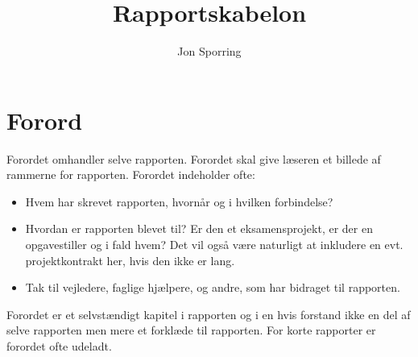 \documentclass[a4paper]{article}
\title{Rapportskabelon}
\author{Jon Sporring }
\begin{document}
\maketitle %

\section{Forord}
Forordet omhandler selve rapporten. Forordet skal give læseren et billede af rammerne for rapporten. Forordet indeholder ofte:
\begin{itemize}
\item Hvem har skrevet rapporten, hvornår og i hvilken forbindelse?
\item Hvordan er rapporten blevet til? Er den et eksamensprojekt, er der en opgavestiller og i fald hvem? Det vil også være naturligt at inkludere en evt. projektkontrakt her, hvis den ikke er lang.
\item Tak til vejledere, faglige hjælpere, og andre, som har bidraget til rapporten.
\end{itemize}
Forordet er et selvstændigt kapitel i rapporten og i en hvis forstand ikke en del af selve rapporten men mere et forklæde til rapporten. For korte rapporter er forordet ofte udeladt.
\end{document}
